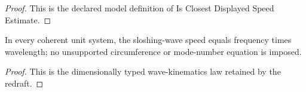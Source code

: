 \begin{proof}
  This is the declared model definition of Is Closest Displayed Speed Estimate.
\end{proof}
\begin{definition}
  \label{def:physics:phyx-mini-0206:phyxminiproblems-problemphyxmini0206-satisfiesresonantwavekinematics}
  In every coherent unit system, the sloshing-wave speed equals frequency times wavelength; no unsupported circumference or mode-number equation is imposed.
\end{definition}
\begin{proof}
  This is the dimensionally typed wave-kinematics law retained by the redraft.
\end{proof}
